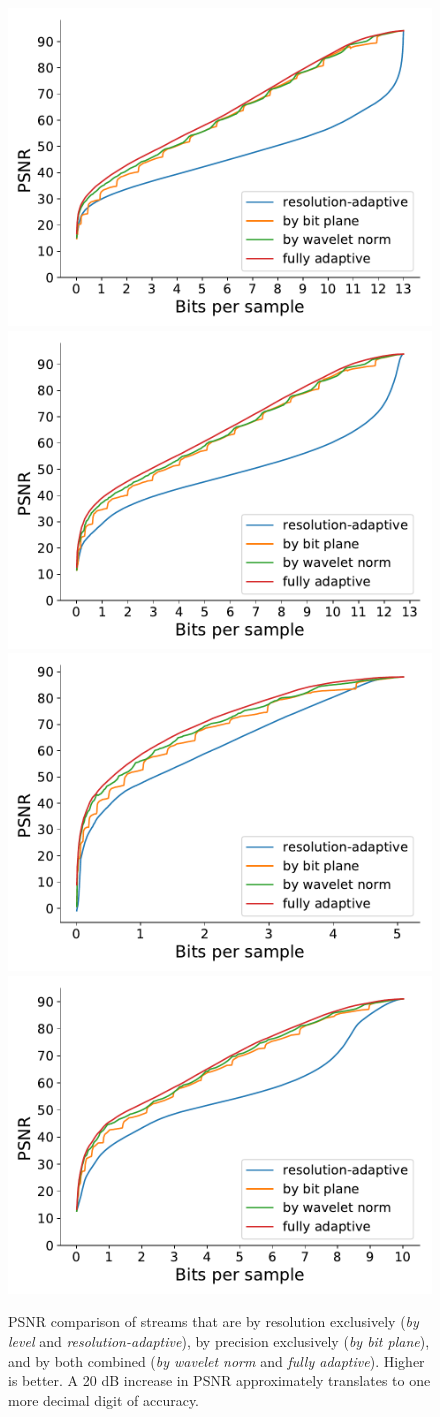 \begin{figure}
	\centering
	{\includegraphics[width=0.44\linewidth]{img/motivation/magnetic-motivation.pdf}}
	{\includegraphics[width=0.44\linewidth]{img/motivation/boiler-o2-motivation.pdf}}
	{\includegraphics[width=0.44\linewidth]{img/motivation/kflame-oh-motivation.pdf}}
	{\includegraphics[width=0.44\linewidth]{img/motivation/miranda-diffusivity-motivation.pdf}}
	\caption{PSNR comparison of streams that are by resolution exclusively (\emph{by level} and
	\emph{resolution-adaptive}), by precision exclusively (\emph{by bit plane}), and by both combined
	(\emph{by wavelet norm} and \emph{fully adaptive}). Higher is better. A 20 dB increase in PSNR
	approximately translates to one more decimal digit of accuracy.}
	\label{fig:motivation}
\end{figure}

